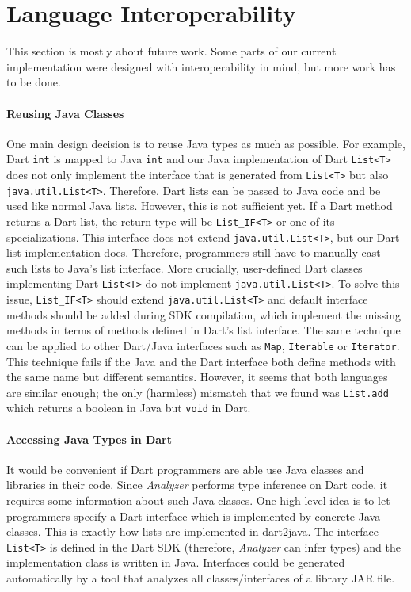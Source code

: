 \documentclass[sigplan]{acmart}
\begin{document}
\section{Language Interoperability}
\label{sec:interop}
This section is mostly about future work. Some parts of our current implementation were designed with interoperability in mind, but more work has to be done.

\paragraph{Reusing Java Classes}
One main design decision is to reuse Java types as much as possible. For example, Dart \texttt{int} is mapped to Java \texttt{int} and our Java implementation of Dart \texttt{List<T>} does not only implement the interface that is generated from \texttt{List<T>} but also \texttt{java.util.List<T>}. Therefore, Dart lists can be passed to Java code and be used like normal Java lists. However, this is not sufficient yet. If a Dart method returns a Dart list, the return type will be \texttt{List\_IF<T>} or one of its specializations. This interface does not extend \texttt{java.util.List<T>}, but our Dart list implementation does. Therefore, programmers still have to manually cast such lists to Java's list interface. More crucially, user-defined Dart classes implementing Dart \texttt{List<T>} do not implement \texttt{java.util.List<T>}. To solve this issue, \texttt{List\_IF<T>} should extend \texttt{java.util.List<T>} and default interface methods should be added during SDK compilation, which implement the missing methods in terms of methods defined in Dart's list interface. The same technique can be applied to other Dart/Java interfaces such as \texttt{Map}, \texttt{Iterable} or \texttt{Iterator}. This technique fails if the Java and the Dart interface both define methods with the same name but different semantics. However, it seems that both languages are similar enough; the only (harmless) mismatch that we found was \texttt{List.add} which returns a boolean in Java but \texttt{void} in Dart.

\paragraph{Accessing Java Types in Dart}
It would be convenient if Dart programmers are able use Java classes and libraries in their code. Since \emph{Analyzer} performs type inference on Dart code, it requires some information about such Java classes. One high-level idea is to let programmers specify a Dart interface which is implemented by concrete Java classes. This is exactly how lists are implemented in dart2java. The interface \texttt{List<T>} is defined in the Dart SDK (therefore, \emph{Analyzer} can infer types) and the implementation class is written in Java. Interfaces could be generated automatically by a tool that analyzes all classes/interfaces of a library JAR file.
\end{document}
